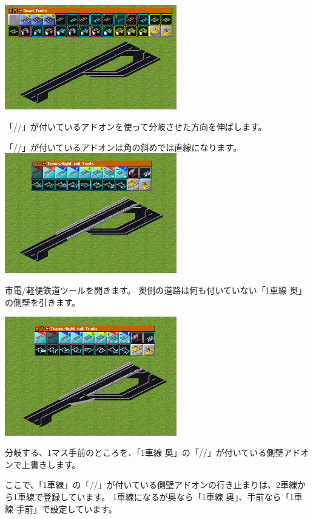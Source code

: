 \documentclass{jbook}
\begin{document}
\begin{multicols}{2}
\includegraphics[width = 75mm]{picture/20210214-road-2-3.png}

「//」が付いているアドオンを使って分岐させた方向を伸ばします。

「//」が付いているアドオンは角の斜めでは直線になります。\\

\includegraphics[width = 75mm]{picture/20210214-road-2-4.png}

市電/軽便鉄道ツールを開きます。
奥側の道路は何も付いていない「1車線 奥」の側壁を引きます。\\

\newpage

\includegraphics[width = 75mm]{picture/20210214-road-2-5.png}

分岐する、1マス手前のところを、「1車線 奥」の「//」が付いている側壁アドオンで上書きします。

ここで、「1車線」の「//」が付いている側壁アドオンの行き止まりは、2車線から1車線で登録しています。
1車線になるが奥なら「1車線 奥」、手前なら「1車線 手前」で設定しています。\\


\end{multicols}
\end{document}
